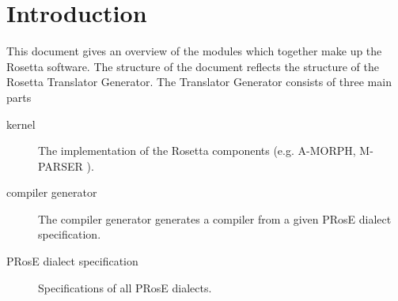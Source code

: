 \makeindex

   \RosDate{\today}
   \RosSupersedes{-}
   \RosKeywords{}
   \MakeRosTitle

\newcommand{\prog}[2]{\item[#1:#2\index{#2} (p)] : }
\newcommand{\modl}[2]{\item[#1:#2\index{#2} (m)] : }
\newcommand{\env}[2]{\item[#1:#2\index{#2} (oe)] : }
\newcommand{\envmodl}[2]{\item[#1:#2\index{#2} (em)] : }
\newcommand{\impmodl}[2]{\item[#1:#2\index{#2} (im)] : }
\newcommand{\ldmodl}[2]{\item[#1:#2\index{#2} (ld)] : }
\newcommand{\lsmodl}[2]{\item[#1:#2\index{#2} (ls)] : }
\newcommand{\data}[2]{\item[#1:#2\index{#2} (da)] : }
\newcommand{\exe}[2]{\item[#1:#2\index{#2} (exe)] : }
\newcommand{\com}[2]{\item[#1:#2\index{#2} (com)] : }
\newcommand{\prosefile}[2]{\item[#1:#2\index{#2} (pr)] : }
\newcommand{\prosedef}[2]{\item[#1:#2\index{#2} (pd)] : }
\newcommand{\ldimodl}[2]{\item[#1:#2\index{#2} (ldi)] : }
\newcommand{\bsc}{\begin{description}}
\newcommand{\esc}{\end{description}}
\newcommand{\mnm}[1]{{\bf #1}}
\newcommand{\indexentry}[2]{\item {\bf #1}, #2}

\section{Introduction}
This document gives an overview of the modules which together make up the
Rosetta software. The structure of the document reflects the
structure of the Rosetta Translator Generator.
The Translator Generator consists of three main parts
\begin{description}
\item [kernel] The implementation of the Rosetta components (e.g. A-MORPH, M-PARSER ).
\item [compiler generator] The compiler generator generates a compiler from
a given {\sf PRosE} dialect specification.
\item [{\sf PRosE} dialect specification] Specifications of all {\sf PRosE} dialects.
\end{description}


